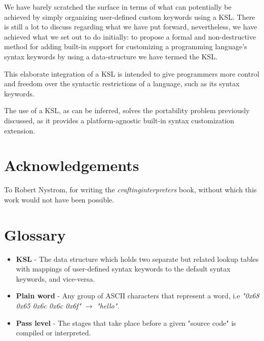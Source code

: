 \documentclass{article}
\begin{document}
We have barely scratched the surface in terms of what can potentially be achieved by simply organizing user-defined custom keywords using a KSL. There is still a lot to discuss regarding what we have put forward, nevertheless, we have achieved what we set out to do initially: to propose a formal and non-destructive method for adding built-in support for customizing a programming language's syntax keywords by using a data-structure we have termed the KSL.
  
This elaborate integration of a KSL is intended to give programmers more control and freedom over the syntactic restrictions of a language, such as its syntax keywords.
  
The use of a KSL, as can be inferred, solves the portability problem previously discussed, as it provides a platform-agnostic built-in syntax customization extension.

\section*{Acknowledgements}
To Robert Nystrom, for writing the \textit{craftinginterpreters} \cite{CI} book, without which this work would not have been possible.

\section*{Glossary}

\begin{itemize}
	\item \textbf{KSL} - The data structure which holds two separate but related lookup tables with mappings of user-defined syntax keywords to the default syntax keywords, and vice-versa.
	\item \textbf{Plain word} - Any group of ASCII characters that represent a word, i.e \textit{"0x68 0x65 0x6c 0x6c 0x6f"} $\rightarrow$ \textit{"hello"}.
	\item \textbf{Pass level} - The stages that take place before a given "source code" is compiled or interpreted.
\end{itemize}



\end{document}
